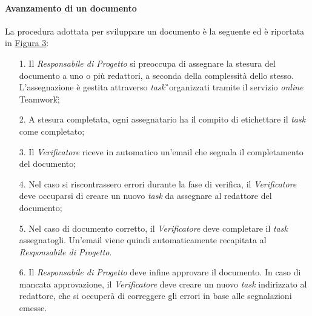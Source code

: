 \paragraph{Avanzamento di un documento}
La procedura adottata per sviluppare un documento è la seguente ed è riportata in \hyperref[sec:Figura3]{Figura 3}:
\begin{itemize}
	\item [1.] Il \textit{Responsabile di Progetto} si preoccupa di assegnare la stesura del documento a uno o più redattori, a seconda della complessità dello stesso. L'assegnazione è gestita attraverso \textit{task}\G\ organizzati tramite il servizio \textit{online} Teamwork\G; 
	\item [2.] A stesura completata, ogni assegnatario ha il compito di etichettare il \textit{task} come completato;
	\item [3.] Il \textit{Verificatore} riceve in automatico un'email che segnala il completamento del documento;
	\item [4.] Nel caso si riscontrassero errori durante la fase di verifica, il \textit{Verificatore} deve occuparsi di creare un nuovo \textit{task} da assegnare al redattore del documento;
	\item [5.] Nel caso di documento corretto, il \textit{Verificatore} deve completare il \textit{task} assegnatogli. Un'email viene quindi automaticamente recapitata al \textit{Responsabile di Progetto}.
	\item [6.] Il \textit{Responsabile di Progetto} deve infine approvare il documento. In caso di mancata approvazione, il \textit{Verificatore} deve creare un nuovo \textit{task} indirizzato al redattore, che si occuperà di correggere gli errori in base alle segnalazioni emesse. 
\end{itemize}

